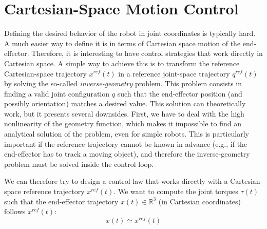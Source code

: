 	
\section{Cartesian-Space Motion Control}	
	Defining the desired behavior of the robot in joint coordinates is typically hard. A much easier way to define it is in terms of Cartesian space motion of the end-effector. Therefore, it is interesting to have control strategies that work directly in Cartesian space. A simple way to achieve this is to transform the reference Cartesian-space trajectory $x^{ref}(t)$ in a reference joint-space trajectory $q^{ref}(t)$ by solving the so-called \emph{inverse-geometry} problem. This problem consists in finding a valid joint configuration $q$ such that the end-effector position (and possibly orientation) matches a desired value. 
	This solution can theoretically work, but it presents several downsides. First, we have to deal with the high nonlinearity of the geometry function, which makes it impossible to find an analytical solution of the problem, even for simple robots. This is particularly important if the reference trajectory cannot be known in advance (e.g., if the end-effector has to track a moving object), and therefore the inverse-geometry problem must be solved inside the control loop.
	
	We can therefore try to design a control law that works directly with a Cartesian-space reference trajectory $x^{ref}(t)$. We want to compute the joint torques $\tau(t)$ such that the end-effector trajectory $x(t) \in \mathds R^3$ (in Cartesian coordinates) follows $x^{ref}(t)$:
	\[ x(t) \simeq x^{ref}(t) \]
	
